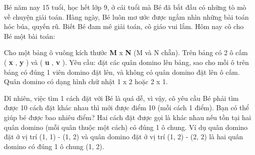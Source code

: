 Bé năm nay 15 tuổi, học hết lớp 9, ở cái tuổi mà Bé đã bắt đầu có những tò mò về chuyện giải toán. Hàng ngày, Bé luôn mơ ước được ngắm nhìn những bài toán hóc búa, quyến rũ. Biết Bé đam mê giải toán, cô giáo vui lắm. Hôm nay cô cho Bé một bài toán:  

   Cho một bảng ô vuông kích thước   \textbf{    M   }   x   \textbf{    N   }   (M và N chẵn). Trên bảng có 2 ô cấm (   \textbf{    x   }   ,   \textbf{    y   }   ) và (   \textbf{    u   }   ,   \textbf{    v   }   ). Yêu cầu: đặt các quân domino lên bảng, sao cho mỗi ô trên bảng có đúng 1 viên domino đặt lên, và không có quân domino đặt lên ô cấm. Quân domino có dạng hình chữ nhật 1 x 2 hoặc 2 x 1.   





   Dĩ nhiên, việc tìm 1 cách đặt với Bé là quá dễ, vì vậy, cô yêu cầu Bé phải tìm được 10 cách đặt khác nhau thì mới được điểm 10 (mỗi cách 1 điểm). Bạn có thể giúp bé được bao nhiêu điểm? Hai cách đặt được gọi là khác nhau nếu tồn tại hai quân domino (mỗi quân thuộc một cách) có đúng 1 ô chung. Ví dụ quân domino đặt ở vị trí (1, 1) - (1, 2) và quân domino đặt ở vị trí (1, 2) - (2, 2) là hai quân domino có đúng 1 ô chung (1, 2).